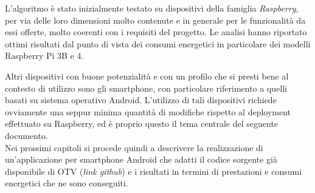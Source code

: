 L'algoritmo è stato inizialmente testato su dispositivi della famiglia \textit{Raspberry}, per via delle loro dimensioni molto
contenute e in generale per le funzionalità da essi offerte, molto coerenti con i requisiti del progetto. Le analisi hanno
riportato ottimi risultati dal punto di vista dei consumi energetici in particolare dei modelli Raspberry Pi 3B e 4.\cite{app11157027} 

Altri dispositivi con buone potenzialità e con un profilo che si presti bene al contesto di utilizzo sono gli smartphone,
con particolare riferimento a quelli basati su sistema operativo Android. L'utilizzo di tali dispositivi richiede ovviamente
una seppur minima quantità di modifiche rispetto al deployment effettuato su Raspberry, ed è proprio questo il tema centrale
del seguente documento.\\
Nei prossimi capitoli si procede quindi a descrivere la realizzazione di un'applicazione per smartphone Android che adatti il codice
sorgente già disponibile di OTV (\textit{link github}) e i risultati in termini di prestazioni e consumi energetici che ne sono conseguiti.




\clearpage{\pagestyle{empty}\cleardoublepage}